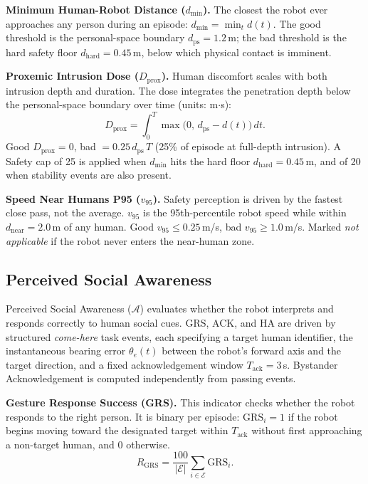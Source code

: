 \documentclass[conference]{IEEEtran}
\begin{document}
\textbf{Minimum Human-Robot Distance ($d_{\min}$).}
The closest the robot ever approaches any person during an episode:
$d_{\min} = \min_t d(t)$.
The good threshold is the personal-space boundary $d_\text{ps} = 1.2$\,m;
the bad threshold is the hard safety floor $d_\text{hard} = 0.45$\,m,
below which physical contact is imminent.

\textbf{Proxemic Intrusion Dose ($D_\text{prox}$).}
Human discomfort scales with both intrusion depth and duration.
The dose integrates the penetration depth below the personal-space boundary
over time (units: m$\cdot$s):
\begin{equation}
	D_\text{prox} = \int_0^T \max\!\bigl(0,\, d_\text{ps} - d(t)\bigr)\,dt.
\end{equation}
Good $D_\text{prox} = 0$, bad $= 0.25\,d_\text{ps}\,T$ (25\% of episode at
full-depth intrusion).
A Safety cap of 25 is applied when $d_{\min}$ hits the hard floor $d_\text{hard} = 0.45$\,m, and
of 20 when stability events are also present.

\textbf{Speed Near Humans P95 ($v_{95}$).}
Safety perception is driven by the fastest close pass, not the average.
$v_{95}$ is the 95th-percentile robot speed while within
$d_\text{near} = 2.0$\,m of any human.
Good $v_{95} \le 0.25$\,m/s, bad $v_{95} \ge 1.0$\,m/s.
Marked \textit{not applicable} if the robot never enters the near-human zone.

\subsection{Perceived Social Awareness}

Perceived Social Awareness ($\mathcal{A}$) evaluates whether the robot
interprets and responds correctly to human social cues.
GRS, ACK, and HA are driven by structured \textit{come-here} task events, each
specifying a target human identifier, the instantaneous bearing error
$\theta_e(t)$ between the robot's forward axis and the target direction, and a
fixed acknowledgement window $T_\text{ack} = 3$\,s.
Bystander Acknowledgement is computed independently from passing events.

\textbf{Gesture Response Success (GRS).}
This indicator checks whether the robot responds to the right person.
It is binary per episode: $\text{GRS}_i = 1$ if the robot begins moving toward
the designated target within $T_\text{ack}$ without first approaching a
non-target human, and $0$ otherwise.
\begin{equation}
	R_\text{GRS} = \frac{100}{|\mathcal{E}|}
	\sum_{i \in \mathcal{E}} \text{GRS}_i.
\end{equation}
\end{document}
